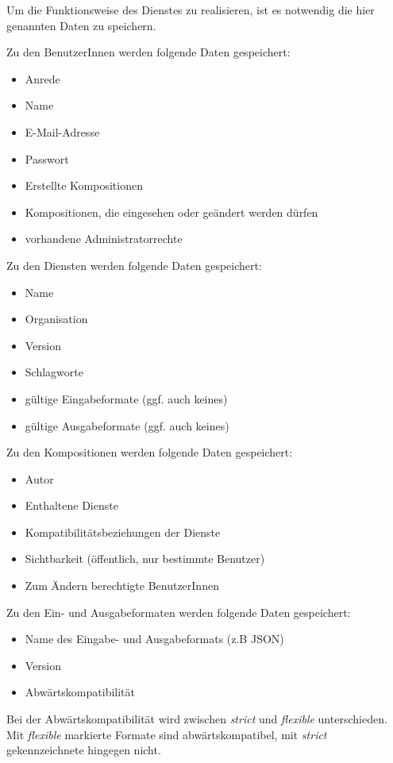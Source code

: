 Um die Funktionsweise des Dienstes zu realisieren, ist es notwendig die hier genannten Daten zu speichern.

Zu den BenutzerInnen werden folgende Daten gespeichert:
\begin{itemize}
	\item Anrede
	\item Name
	\item E-Mail-Adresse
	\item Passwort
	\item Erstellte Kompositionen
	\item Kompositionen, die eingesehen oder geändert werden dürfen
	\item vorhandene Administratorrechte
\end{itemize}
Zu den Diensten werden folgende Daten gespeichert:
\begin{itemize}
	\item Name
	\item Organisation
	\item Version
	\item Schlagworte
	\item gültige Eingabeformate (ggf. auch keines)
	\item gültige Ausgabeformate (ggf. auch keines)
\end{itemize}
Zu den Kompositionen werden folgende Daten gespeichert:
\begin{itemize}
	\item Autor
	\item Enthaltene Dienste
	\item Kompatibilitätsbeziehungen der Dienste
	\item Sichtbarkeit (öffentlich, nur bestimmte Benutzer)
	\item Zum Ändern berechtigte BenutzerInnen
\end{itemize}

Zu den Ein- und Ausgabeformaten werden folgende Daten gespeichert:
\begin{itemize}
	\item Name des Eingabe- und Ausgabeformats (z.B JSON)
	\item Version
	\item Abwärtskompatibilität\\
\end{itemize}
Bei der Abwärtskompatibilität wird zwischen \textit{strict} und \textit{flexible} unterschieden. Mit \textit{flexible} markierte Formate sind abwärtskompatibel, mit \textit{strict} gekennzeichnete hingegen nicht.

